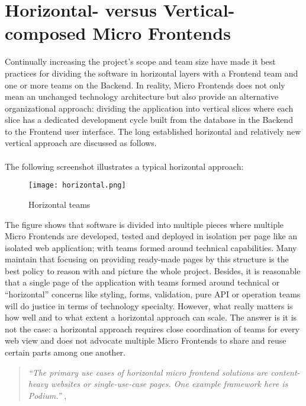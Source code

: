 \documentclass[a4paper]{book}
\begin{document}
\section{Horizontal- versus Vertical-composed Micro Frontends \label{Vertical Micro Frontends}}
Continually increasing the project's scope and team size have made it best practices for dividing the software in horizontal layers with a Frontend team and one or more teams on the Backend. In reality, Micro Frontends does not only mean an unchanged technology architecture but also provide an alternative organizational approach: dividing the application into vertical slices where each slice has a dedicated development cycle built from the database in the Backend to the Frontend user interface. The long established horizontal and relatively new vertical approach are discussed as follows.
\\
\\
The following screenshot illustrates a typical horizontal approach: 

\begin{figure}[h!]
    \centering
    \captionsetup{justification=centering}
    \texttt{[image: horizontal.png]}
    \caption{Horizontal teams \cite{Rap20}}
    \label{fig:1}
\end{figure}

The figure shows that software is divided into multiple pieces where multiple Micro Frontends are developed, tested and deployed in isolation per page like an isolated web application; with teams formed around technical capabilities. Many maintain that focusing on providing ready-made pages by this structure is the best policy to reason with and picture the whole project. Besides, it is reasonable that a single page of the application with teams formed around technical or “horizontal” concerns like styling, forms, validation, pure API or operation teams will do justice in terms of technology specialty. However, what really matters is how well and to what extent a horizontal approach can scale. The answer is it is not the case: a horizontal approach requires close coordination of teams for every web view and does not advocate multiple Micro Frontends to share and reuse certain parts among one another. \cite{Rap20}
\begin{quote}
    \textit{“The primary use cases of horizontal micro frontend solutions are content-heavy websites or single-use-case pages. One example framework here is Podium.”} \cite{Podium}, \cite{Rap20}
\end{quote}
\end{document}

